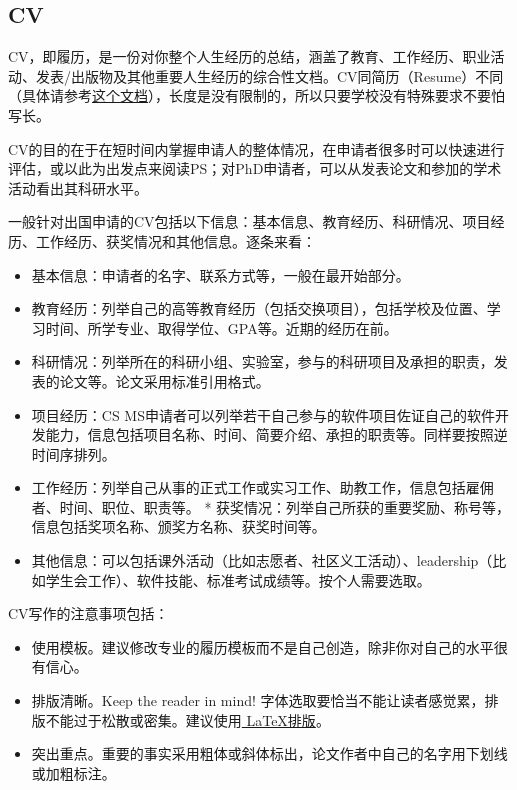 \subsection{CV}

CV，即履历，是一份对你整个人生经历的总结，涵盖了教育、工作经历、职业活动、发表/出版物及其他重要人生经历的综合性文档。CV同简历（Resume）不同（具体请参考\href{http://studentaffairs.psu.edu/career/pdf/CG/CG_Vita.pdf}{这个文档}），长度是没有限制的，所以只要学校没有特殊要求不要怕写长。\par

CV的目的在于在短时间内掌握申请人的整体情况，在申请者很多时可以快速进行评估，或以此为出发点来阅读PS；对PhD申请者，可以从发表论文和参加的学术活动看出其科研水平。\par

一般针对出国申请的CV包括以下信息：基本信息、教育经历、科研情况、项目经历、工作经历、获奖情况和其他信息。逐条来看：
\begin{itemize}
\item 基本信息：申请者的名字、联系方式等，一般在最开始部分。
\item 教育经历：列举自己的高等教育经历（包括交换项目），包括学校及位置、学习时间、所学专业、取得学位、GPA等。近期的经历在前。
\item 科研情况：列举所在的科研小组、实验室，参与的科研项目及承担的职责，发表的论文等。论文采用标准引用格式。
\item 项目经历：CS MS申请者可以列举若干自己参与的软件项目佐证自己的软件开发能力，信息包括项目名称、时间、简要介绍、承担的职责等。同样要按照逆时间序排列。
\item 工作经历：列举自己从事的正式工作或实习工作、助教工作，信息包括雇佣者、时间、职位、职责等。
* 获奖情况：列举自己所获的重要奖励、称号等，信息包括奖项名称、颁奖方名称、获奖时间等。
\item 其他信息：可以包括课外活动（比如志愿者、社区义工活动）、leadership（比如学生会工作）、软件技能、标准考试成绩等。按个人需要选取。
\end{itemize}

CV写作的注意事项包括：
\begin{itemize}
\item 使用模板。建议修改专业的履历模板而不是自己创造，除非你对自己的水平很有信心。
\item 排版清晰。Keep the reader in mind! 字体选取要恰当不能让读者感觉累，排版不能过于松散或密集。建议使用\href{www.latextemplates.com}{ \LaTeX{}排版}。
\item 突出重点。重要的事实采用粗体或斜体标出，论文作者中自己的名字用下划线或加粗标注。
\end{itemize}


